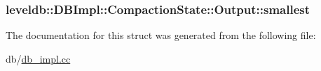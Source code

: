 \hypertarget{structleveldb_1_1_d_b_impl_1_1_compaction_state_1_1_output_a88ada857d0cf32ae8e76d7baf4e80c69}{
\subsubsection[{smallest}]{ leveldb\-::\-D\-B\-Impl\-::\-Compaction\-State\-::\-Output\-::smallest}}\label{structleveldb_1_1_d_b_impl_1_1_compaction_state_1_1_output_a88ada857d0cf32ae8e76d7baf4e80c69}


The documentation for this struct was generated from the following file\-:\begin{DoxyCompactItemize}
\item 
db/\hyperlink{db__impl_8cc}{db\-\_\-impl.\-cc}\end{DoxyCompactItemize}
